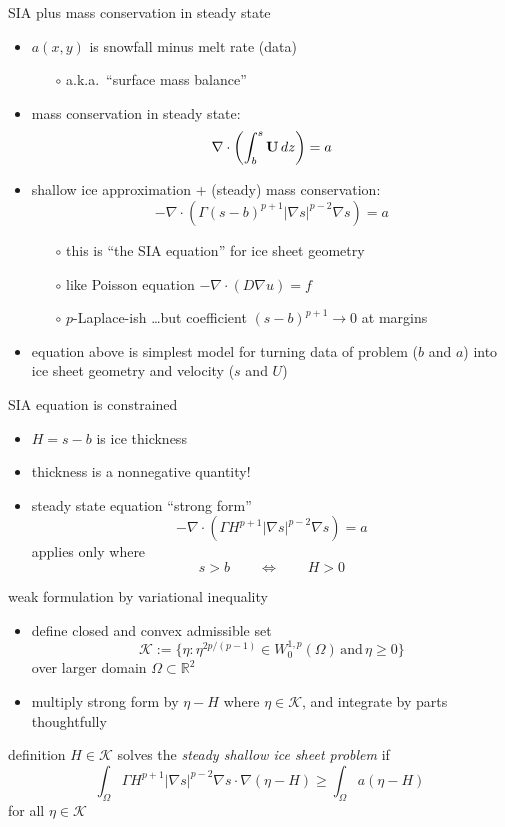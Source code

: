 \documentclass[hide notes,intlimits]{beamer}
\newcommand{\RR}{\mathbb{R}}
\newcommand{\Kcal}{\mathcal{K}}
\newcommand{\Div}{\nabla\cdot}
\newcommand{\grad}{\nabla}
\begin{document}
\begin{frame}{SIA plus mass conservation in steady state}

\begin{itemize}
\item $a(x,y)$ is snowfall minus melt rate (data)
  \begin{itemize}
  \item[$\circ$] a.k.a.~``surface mass balance''
  \end{itemize}
\item mass conservation in steady state: 
  $$\Div \left(  \int_b^s {\bf U}\, dz \right)  =  a$$
\item shallow ice approximation + (steady) mass conservation:
  $$-\Div \left(\Gamma (s-b)^{p+1} | \nabla s |^{p-2} \nabla s\right) =  a$$
  \begin{itemize}
  \vspace{-0.2in}
  \item[$\circ$] this is ``the SIA equation'' for ice sheet geometry
  \item[$\circ$] like Poisson equation $-\Div (D \grad u) = f$
  \item[$\circ$] $p$-Laplace-ish \dots but coefficient $(s-b)^{p+1} \to 0$ at margins
  \end{itemize}
\item equation above is simplest model for turning data of problem ($b$ and $a$) into ice sheet geometry and velocity ($s$ and $U$)
\end{itemize}
\end{frame}


\begin{frame}{SIA equation is constrained} 
\begin{itemize}
\item $H=s-b$ is ice thickness
\item thickness is a nonnegative quantity!
\item steady state equation ``strong form''
  $$-\Div \left(\Gamma H^{p+1} |\nabla s|^{p-2} \nabla s  \right) =  a$$
applies only where
  $$s>b \qquad \iff \qquad H > 0$$
\end{itemize}
\end{frame}


\begin{frame}{weak formulation by variational inequality} 
\begin{itemize}
\item define closed and convex admissible set
  $$\Kcal := \{\eta : \eta^{2p/(p-1)} \in W^{1,p}_0 (\Omega) \,\text{and}\, \eta \ge 0\}$$
over larger domain $\Omega \subset \RR^2$
\item multiply strong form by $\eta-H$ where $\eta\in \Kcal$, and integrate by parts thoughtfully
\end{itemize}
\begin{block}{definition} 
$H \in \Kcal$ solves the \emph{steady shallow ice sheet problem} if
  $$\int_{\Omega}  \Gamma H^{p+1} |\grad s|^{p-2} \grad s \cdot \grad(\eta - H)  
\ge \int_{\Omega} a (\eta - H)$$
for all $\eta \in \Kcal$
\end{block}
\end{frame}
\end{document}
